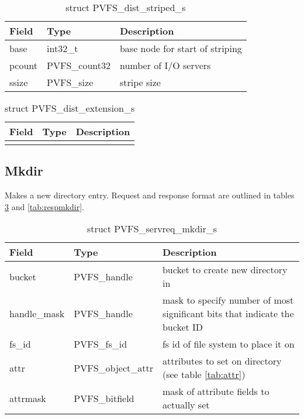 \documentclass[11pt, letterpaper]{article} %
\begin{document}
\begin{table}[H]
\begin{tabular}{|l|l|l|}
\hline
Field & Type & Description \\
\hline
\hline
base & int32\_t & base node for start of striping\\
\hline
pcount & PVFS\_count32 & number of I/O servers\\
\hline
ssize & PVFS\_size & stripe size\\
\hline
\end{tabular}
\caption{struct PVFS\_dist\_striped\_s \label{tab:striped}}
\end{table}

\begin{table}[H]
\begin{tabular}{|l|l|l|}
\hline
Field & Type & Description \\
\hline
\hline
[ EMPTY ] & & \\
\hline
\end{tabular}
\caption{struct PVFS\_dist\_extension\_s \label{tab:extension}}
\end{table}

\subsection{Mkdir}

Makes a new directory entry.  Request and response format are outlined
in tables \ref{tab:reqmkdir} and \ref{tab:respmkdir}.

\begin{table}[H]
\begin{tabular}{|l|l|l|}
\hline
Field & Type & Description \\
\hline
\hline
bucket & PVFS\_handle & bucket to create new directory in\\
\hline
handle\_mask & PVFS\_handle & mask to specify number of most significant
bits that indicate the bucket ID\\
\hline
fs\_id & PVFS\_fs\_id & fs id of file system to place it on\\
\hline
attr & PVFS\_object\_attr & attributes to set on directory (see table
\ref{tab:attr})\\
\hline
attrmask & PVFS\_bitfield & mask of attribute fields to actually set\\
\hline
\end{tabular}
\caption{struct PVFS\_servreq\_mkdir\_s \label{tab:reqmkdir}}
\end{table}
\end{document}
